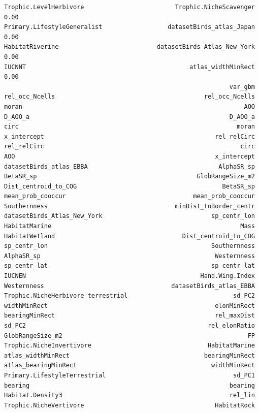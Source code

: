 \documentclass[
  letterpaper,
  DIV=11,
  numbers=noendperiod]{scrreprt}
\begin{document}
\begin{verbatim}
Trophic.LevelHerbivore                         Trophic.NicheScavenger    0.00
Primary.LifestyleGeneralist                  datasetBirds_atlas_Japan    0.00
HabitatRiverine                           datasetBirds_Atlas_New_York    0.00
IUCNNT                                             atlas_widthMinRect    0.00
                                                              var_gbm
rel_occ_Ncells                                         rel_occ_Ncells
moran                                                             AOO
D_AOO_a                                                       D_AOO_a
circ                                                            moran
x_intercept                                               rel_relCirc
rel_relCirc                                                      circ
AOO                                                       x_intercept
datasetBirds_atlas_EBBA                                    AlphaSR_sp
BetaSR_sp                                            GlobRangeSize_m2
Dist_centroid_to_COG                                        BetaSR_sp
mean_prob_cooccur                                   mean_prob_cooccur
Southernness                                   minDist_toBorder_centr
datasetBirds_Atlas_New_York                              sp_centr_lon
HabitatMarine                                                    Mass
HabitatWetland                                   Dist_centroid_to_COG
sp_centr_lon                                             Southernness
AlphaSR_sp                                                Westernness
sp_centr_lat                                             sp_centr_lat
IUCNEN                                                Hand.Wing.Index
Westernness                                   datasetBirds_atlas_EBBA
Trophic.NicheHerbivore terrestrial                             sd_PC2
widthMinRect                                              elonMinRect
bearingMinRect                                            rel_maxDist
sd_PC2                                                  rel_elonRatio
GlobRangeSize_m2                                                   FP
Trophic.NicheInvertivore                                HabitatMarine
atlas_widthMinRect                                     bearingMinRect
atlas_bearingMinRect                                     widthMinRect
Primary.LifestyleTerrestrial                                   sd_PC1
bearing                                                       bearing
Habitat.Density3                                              rel_lin
Trophic.NicheVertivore                                    HabitatRock

\end{verbatim}
\end{document}
